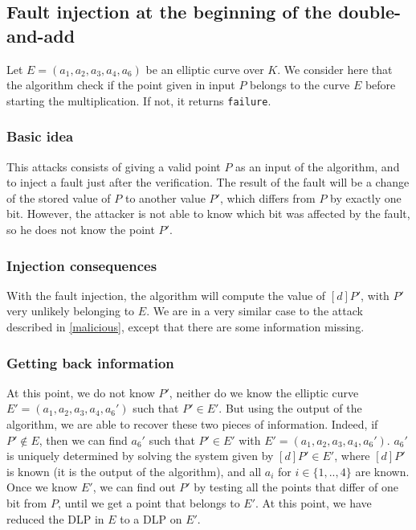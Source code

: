 \documentclass[journal]{IEEEtran}
\begin{document}
\subsection{Fault injection at the beginning of the double-and-add}
Let $E = (a_1, a_2, a_3, a_4, a_6)$ be an elliptic curve over $K$.
We consider here that the algorithm check if the point given in input $P$ belongs
to the curve $E$ before starting the multiplication. If not, it returns {\tt failure}.\\

\subsubsection{Basic idea}
This attacks consists of giving a valid point $P$ as an input of the algorithm, and to 
inject a fault just after the verification. The result of the fault will be a change of the
stored value of $P$ to another value $P'$, which differs from $P$ by exactly one bit. 
However, the attacker is not able to know which bit was affected by the fault, so he 
does not know the point $P'$. \\

\subsubsection{Injection consequences}
With the fault injection, the algorithm will compute the value of $[d]P'$, with $P'$ very unlikely
belonging to $E$. We are in a very similar case to the attack described in \ref{malicious}, except that
there are some information missing. \\

\subsubsection{Getting back information}
At this point, we do not know $P'$, neither do we know the elliptic curve $E' = (a_1, a_2, a_3, a_4, a_6')$
such that $P' \in E'$. But using the output of the algorithm, we are able to recover these two pieces of information.
Indeed, if $P' \notin E$, then we can find $a_6'$ such that $P' \in E'$ with $E' = (a_1, a_2, a_3, a_4, a_6')$. $a_6'$ is uniquely determined by solving
the system given by $[d]P' \in E'$, where $[d]P'$ is known (it is the output of the algorithm), 
and all $a_i$ for $i \in \{1, .., 4\}$ are known. 
Once we know $E'$, we can find out $P'$ by testing all the points that differ of one bit from $P$, until we get a point that belongs to $E'$.
At this point, we have reduced the DLP in $E$ to a DLP on $E'$. \\
\end{document}
